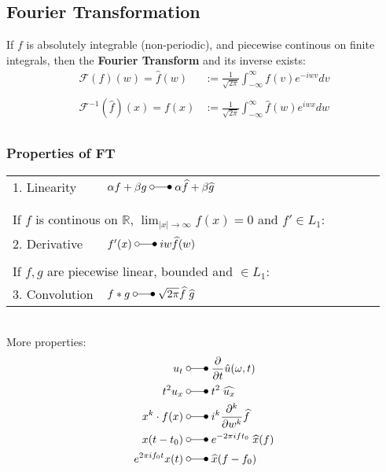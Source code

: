 \subsection{Fourier Transformation}
If $f$ is absolutely integrable (non-periodic), and piecewise continous on finite integrals, 
then the \textbf{Fourier Transform} and its inverse exists:
\begin{align*}
    \mathcal{F}(f)(w)=\widehat{f}(w)&:=\frac1{\sqrt{2\pi}}\int_{-\infty}^{\infty}f(v)e^{-iwv}dv\\\\
    \mathcal{F}^{-1}(\widehat{f})(x)=f(x)&:=\frac1{\sqrt{2\pi}}\int_{-\infty}^{\infty}\widehat{f}(w)e^{iwx}dw\\
\end{align*}
\subsubsection{Properties of FT}


\begin{tabular}[h]{p{0.25\linewidth} p{0.74\linewidth}}
    1. Linearity & $\alpha f+\beta g\;\laplace\;\alpha\widehat{f}+\beta\widehat{g}$\\
    &\\
    &\\
    \multicolumn{2}{p{0.9\linewidth}}{If $f$ is continous on $\mathbb{R}$, $\lim_{|x|\to\infty}f(x)=0$ and $f'\in L_1$:}\\
    2. Derivative & $f^{\prime}(x)\;\laplace\;iw\widehat{f}(w)$\\
    &\\
    \multicolumn{2}{p{0.9\linewidth}}{If $f,g$ are piecewise linear, bounded and $\in L_1$:}\\
    3. Convolution & $f*g\;\laplace\;\sqrt{2\pi}\widehat{f}\;\widehat{g}$\\
\end{tabular}\vspace*{8pt}\\
More properties:
\begin{align*}
    u_t&\;\laplace\;\frac\partial{\partial t}\hat{u}(\omega,t) \\
    t^2u_x&\;\laplace\; t^2\;\widehat{u_x} \\
    x^k\cdot f(x)&\;\laplace\;i^k \frac{\partial^k}{\partial w^k}\widehat{f} \\
    x(t-t_0)&\;\laplace\; e^{-2\pi ift_0}\;\widehat{x}(f)\\
    e^{2\pi if_0t}x(t) &\;\laplace\; \widehat{x}(f-f_0)
\end{align*}

